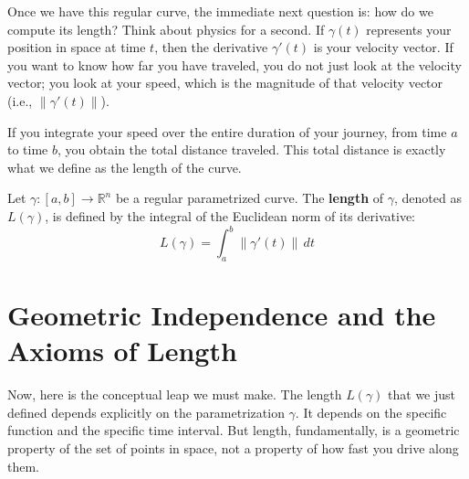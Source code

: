 \begin{spoken-clean}[00:06:10 - 00:07:05]
Once we have this regular curve, the immediate next question is: how do we compute its length? Think about physics for a second. If $\gamma(t)$ represents your position in space at time $t$, then the derivative $\gamma'(t)$ is your velocity vector. If you want to know how far you have traveled, you do not just look at the velocity vector; you look at your speed, which is the magnitude of that velocity vector (i.e., $\|\gamma'(t)\|$).
\end{spoken-clean}

\begin{spoken-clean}[00:07:05 - 00:07:15]
If you integrate your speed over the entire duration of your journey, from time $a$ to time $b$, you obtain the total distance traveled. This total distance is exactly what we define as the length of the curve.
\end{spoken-clean}

\begin{orange-formula}
\begin{definition}
Let $\gamma: [a, b] \to \mathbb{R}^n$ be a regular parametrized curve. The \textbf{length} of $\gamma$, denoted as $L(\gamma)$, is defined by the integral of the Euclidean norm of its derivative:
\begin{equation} \label{eq:arc_length}
L(\gamma) = \int_a^b \|\gamma'(t)\| \, dt
\end{equation}
\end{definition}
\end{orange-formula}


\section{Geometric Independence and the Axioms of Length}

\begin{spoken-clean}[00:07:15 - 00:08:30]
Now, here is the conceptual leap we must make. The length $L(\gamma)$ that we just defined depends explicitly on the parametrization $\gamma$. It depends on the specific function and the specific time interval. But length, fundamentally, is a geometric property of the set of points in space, not a property of how fast you drive along them. 
\end{spoken-clean}

